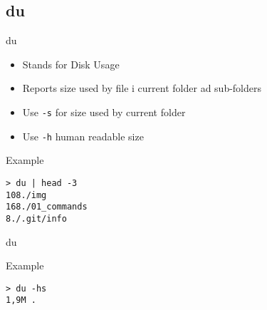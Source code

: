 \subsection{du}

\begin{frame}[fragile]{du}
  \begin{itemize}
    \pause \item Stands for Disk Usage
    \pause \item Reports size used by file i current folder ad sub-folders
    \pause \item Use \texttt{-s} for size used by current folder
    \pause \item Use \texttt{-h} human readable size
  \end{itemize}
  \pause

  \begin{exampleblock}{Example}
    \begin{lstlisting}[showstringspaces=false]
> du | head -3
108./img
168./01_commands
8./.git/info
    \end{lstlisting}
  \end{exampleblock}
\end{frame}

\begin{frame}[fragile]{du}
  \begin{exampleblock}{Example}
    \begin{lstlisting}[showstringspaces=false]
> du -hs
1,9M .
    \end{lstlisting}
  \end{exampleblock}
\end{frame}
